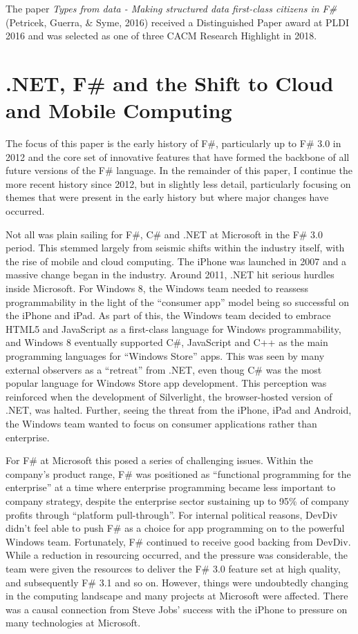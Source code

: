 \documentclass[acmsmall,review]{acmart}\settopmatter{printfolios=true,printccs=false,printacmref=false}
\begin{document}
The paper \textit{Types from data - Making structured data first-class citizens in F\#} (Petricek, Guerra, \& Syme, 2016) received a Distinguished Paper award at PLDI 2016 and was selected as one of three CACM Research Highlight in 2018.



\section*{.NET, F\# and the Shift to Cloud and Mobile Computing}

The focus of this paper is the early history of F\#, particularly up to F\# 3.0 in 2012 and the core set of innovative
features that have formed the backbone of all future versions of the F\# language. In the remainder of this paper, I
continue the more recent history since 2012, but in slightly less detail, particularly focusing on themes that were
present in the early history but where major changes have occurred.

Not all was plain sailing for F\#, C\# and .NET at Microsoft in the F\# 3.0 period.  This stemmed largely from seismic
shifts within the industry itself, with the rise of mobile and cloud computing.  The iPhone was launched in 2007 and a
massive change began in the industry. Around 2011, .NET hit serious hurdles inside Microsoft. For Windows 8, the
Windows team needed to reassess programmability in the light of the “consumer app” model being so successful on the
iPhone and iPad. As part of this, the Windows team decided to embrace HTML5 and JavaScript as a first-class language
for Windows programmability, and Windows 8 eventually supported C\#, JavaScript and C++ as the main programming
languages for “Windows Store” apps.  This was seen by many external observers as a “retreat” from .NET, even thoug
 C\# was the most popular language for Windows Store app development. This perception was reinforced when the
development of Silverlight, the browser-hosted version of .NET, was halted. Further, seeing the threat from the iPhone,
iPad and Android, the Windows team wanted to focus on consumer applications rather than enterprise.  

For F\# at Microsoft this posed a series of challenging issues. Within the company’s product range, F\# was positioned
as “functional programming for the enterprise” at a time where enterprise programming became less important to company
strategy, despite the enterprise sector sustaining up to 95\% of company profits through “platform pull-through”. For internal
political reasons, DevDiv didn’t feel able to push F\# as a choice for app programming on to the powerful Windows team.
Fortunately, F\# continued to receive good backing from DevDiv. While a reduction in resourcing occurred, and the pressure
was considerable, the team were given the resources to deliver the F\# 3.0 feature set at high quality, and
subsequently F\# 3.1 and so on.  However, things were undoubtedly changing in the computing landscape and many
projects at Microsoft were affected. There was a causal connection from Steve Jobs’ success with the iPhone to pressure
on many technologies at Microsoft.  
\end{document}
